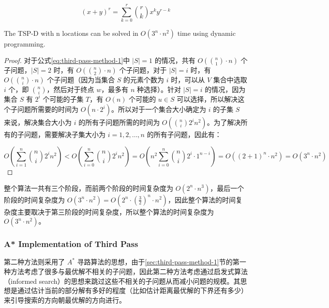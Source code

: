 \documentclass[fontset=none]{ctexart}
\begin{document}
\begin{theorem*}
    \begin{equation}
        (x + y)^r = \sum_{k = 0}^r\binom{r}{k}x^ky^{r-k}
    \end{equation}
\end{theorem*}

\begin{theorem*}
    The TSP-D with n locations can be solved in $O(3^n \cdot n^2)$ time using dynamic programming.
\end{theorem*}

\begin{proof}
    对于公式\cref{eq:third-pass-method-1}中 $\lvert S \rvert = 1$ 的情况，共有 $O\left(\binom{n}{1} \cdot n\right)$ 个子问题，$\lvert S \rvert = 2$ 时，有 $O\left(\binom{n}{2} \cdot n\right)$ 个子问题，对于 $\lvert S \rvert = i$ 时，有 $O\left(\binom{n}{i} \cdot n\right)$ 个子问题（因为当集合 $S$ 的元素个数为 $i$ 时，可以从 $V$ 集合中选取 $i$ 个，即 $\binom{n}{i}$，然后对于终点 $w$，最多有 $n$ 种选择）。针对 $\lvert S \rvert = i$ 的情况，因为集合 $S$ 有 $2^i$ 个可能的子集 $T$，有 $O(n)$ 个可能的 $u \in S$ 可以选择，所以解决这个子问题所需要的时间为 $O\left(n \cdot 2^i\right)$。所以对于一个集合大小确定为 $i$ 的子集 $S$ 来说，解决集合大小为 $i$ 的所有子问题所需的时间为 $O\left(\binom{n}{i}2^in^2\right)$。为了解决所有的子问题，需要解决子集大小为 $i = 1, 2, \dots, n$ 的所有子问题，因此有：

    \begin{equation}
        O\left(\sum_{i = 1}^n\binom{n}{i}2^in^2\right) < O\left(\sum_{i = 0}^n\binom{n}{i}2^in^2\right) = O\left(n^2\sum_{i = 0}^n\binom{n}{i}2^i \cdot 1^{n - i}\right) = O\left((2 + 1)^n \cdot n^2\right) = O\left(3^n \cdot n^2\right)
    \end{equation}
\end{proof}

整个算法一共有三个阶段，而前两个阶段的时间复杂度为 $O\left(2^n \cdot n^3\right)$，最后一个阶段的时间复杂度为 $O\left(3^n \cdot n^2\right) = O\left(2^n \cdot \left(\frac{3}{2}\right)^n \cdot n^2\right)$，因此整个算法的时间复杂度主要取决于第三阶段的时间复杂度，所以整个算法的时间复杂度为 $O\left(3^n \cdot n^2\right)$。

\subsubsection{A* Implementation of Third Pass}

第二种方法则采用了 $A^*$ 寻路算法的思想，由于\cref{sec:third-pass-method-1}节的第一种方法考虑了很多与最优解不相关的子问题，因此第二种方法考虑通过启发式算法（informed search）的思想来跳过这些不相关的子问题从而减小问题的规模。其思想是通过估计当前的部分解有多好的程度（比如估计距离最优解的下界还有多少）来引导搜索的方向朝最优解的方向进行。
\end{document}
